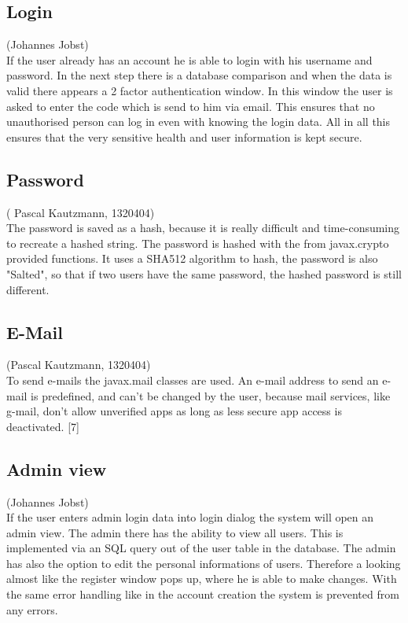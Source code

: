 \documentclass[a4paper, 12pt]{report}
\begin{document}
\subsection{Login}
{\tiny (Johannes Jobst)\\}
If the user already has an account he is able to login with his username and password. In the next step there is a database comparison and when the data is valid there appears a 2 factor authentication window. In this window the user is asked to enter the code which is send to him via email. This ensures that no unauthorised person can log in even with knowing the login data. All in all this ensures that the very sensitive health and user information is kept secure.

\subsection{Password}
{\tiny ( Pascal Kautzmann, 1320404)\\}
The password is saved as a hash, because it is really difficult and time-consuming to recreate a hashed string.
The password is hashed with the from javax.crypto provided functions. It uses a SHA512 algorithm to hash, the password is also "Salted", so that if two users have the same password, the hashed password is still different.

\subsection{E-Mail}
{\tiny (Pascal Kautzmann, 1320404)\\}
To send e-mails the javax.mail classes are used. An e-mail address to send an e-mail is predefined, and can't be changed by the user,
because mail services, like g-mail, don't allow unverified apps as long as  less secure app access is deactivated. [7]


\subsection{Admin view}
{\tiny (Johannes Jobst)\\}
If the user enters admin login data into login dialog the system will open an admin view. The admin there has the ability to view all users. This is implemented via an SQL query out of the user table in the database. The admin has also the option to edit the personal informations of users. Therefore a looking almost like the register window pops up, where he is able to make changes.
With the same error handling like in the account creation the system is prevented from any errors.
\end{document}

